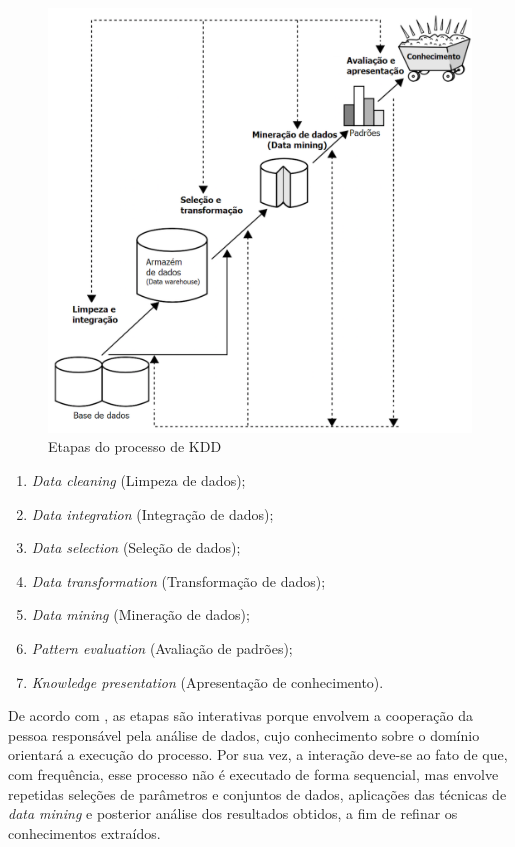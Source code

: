 \begin{figure}
	\centering
	\includegraphics[width=1\textwidth]{Cap3/imagens/kdd}
	\caption{Etapas do processo de KDD}
	\label{kdd-fig}
\end{figure}

\begin{enumerate}
	\item \textit{Data cleaning} (Limpeza de dados);
	\item \textit{Data integration} (Integração de dados);
	\item \textit{Data selection} (Seleção de dados);
	\item \textit{Data transformation} (Transformação de dados);
	\item \textit{Data mining} (Mineração de dados);
	\item \textit{Pattern evaluation} (Avaliação de padrões);
	\item \textit{Knowledge presentation} (Apresentação de conhecimento).
\end{enumerate}


De acordo com , as etapas são interativas porque envolvem a cooperação da pessoa responsável pela análise de dados, cujo conhecimento sobre o domínio orientará a execução do processo. Por sua vez, a interação deve-se ao fato de que, com frequência, esse processo não é executado de forma sequencial, mas envolve repetidas seleções de parâmetros e conjuntos de dados, aplicações das técnicas de \textit{data mining} e posterior análise dos resultados obtidos, a fim de refinar os conhecimentos extraídos.

